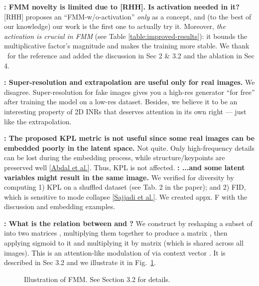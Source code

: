 \documentclass[rebuttal]{cvpr}
\newcommand{\ReviewerA}{\textcolor{cyan}{}}
\newcommand{\ReviewerB}{\textcolor{magenta}{}}
\newcommand{\ReviewerAsays}[1]{\textbf{\ReviewerA: \textbf{#1}}}
\newcommand{\ReviewerBsays}[1]{\textbf{\ReviewerB: \textbf{#1}}}
\begin{document}
\ReviewerAsays{FMM novelty is limited due to [RHH]. Is activation needed in it?}
[RHH] proposes an ``FMM-w/o-activation'' \textit{only} as a concept, and (to the best of our knowledge) our work is the first one to actually try it.
Moreover, \textit{the activation is crucial in FMM} (see Table \ref{table:improved-results}): it bounds the multiplicative factor's magnitude and makes the training more stable.
We thank \ReviewerA\ for the reference and added the discussion in Sec 2 \& 3.2 and the ablation in Sec 4.

\ReviewerAsays{Super-resolution and extrapolation are useful only for real images.}
We disagree. Super-resolution for fake images gives you a high-res generator ``for free'' after training the model on a low-res dataset.
Besides, we believe it to be an interesting property of 2D INRs that deserves attention in its own right --- just like the extrapolation.

\ReviewerAsays{The proposed KPL metric is not useful since some real images can be embedded poorly in the latent space.}
Not quite. Only high-frequency details can be lost during the embedding process, while structure/keypoints are preserved well [\href{https://openaccess.thecvf.com/content_ICCV_2019/html/Abdal_Image2StyleGAN_How_to_Embed_Images_Into_the_StyleGAN_Latent_Space_ICCV_2019_paper}{Abdal et al.}].
Thus, KPL is not affected.
\ReviewerAsays{...and some latent variables might result in the same image.}
We verified for diversity by computing 1) KPL on a shuffled dataset (see Tab. 2 in the paper); and 2) FID, which is sensitive to mode collapse [\href{https://papers.nips.cc/paper/2018/hash/f7696a9b362ac5a51c3dc8f098b73923-Abstract.html}{Sajjadi et al.}].
We created appx. F with the discussion and embedding examples.


\ReviewerBsays{What is the relation between  and ?}
We construct  by reshaping a subset of  into two matrices , multiplying them together to produce a matrix , then applying sigmoid  to it and multiplying it by matrix  (which is shared across all images).
This is an attention-like modulation of  via context vector .
It is described in Sec 3.2 and we illustrate it in Fig.~\ref{rebuttal:fig:fmm}.

\begin{figure}[t]
\centering
\caption{Illustration of FMM. See Section 3.2 for details.}
\label{rebuttal:fig:fmm}
\vspace{-0.4em}
\end{figure}
\end{document}
